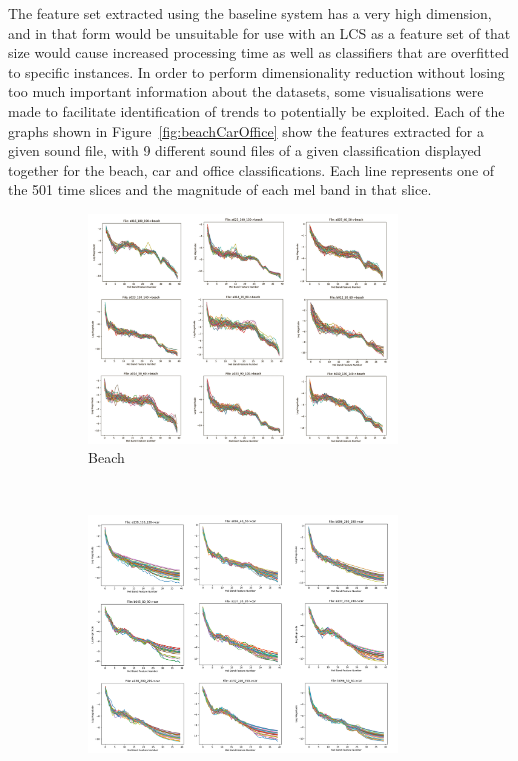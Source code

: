 \documentclass[11pt]{article}
\begin{document}
The feature set extracted using the baseline system has a very high dimension, and in that form would be unsuitable for use with an LCS as a feature set of that size would cause increased processing time as well as classifiers that are overfitted to specific instances. In order to perform dimensionality reduction without losing too much important information about the datasets, some visualisations were made to facilitate identification of trends to potentially be exploited. Each of the graphs shown in Figure~\ref{fig:beachCarOffice} show the features extracted for a given sound file, with 9 different sound files of a given classification displayed together for the beach, car and office classifications. Each line represents one of the 501 time slices and the magnitude of each mel band in that slice.

\begin{figure}[!htbp]
	\centering
	\begin{subfigure}[t]{0.54\textwidth}
		\centering
		\includegraphics[width=0.9\textwidth]{figures/beachgrid.png}
		\caption{Beach}
	\end{subfigure}
	\\
	\vspace{0.2cm}
	\begin{subfigure}[t]{0.54\textwidth}
		\centering
		\includegraphics[width=0.9\textwidth]{figures/cargrid.png}

\end{subfigure}
\end{figure}
\end{document}
